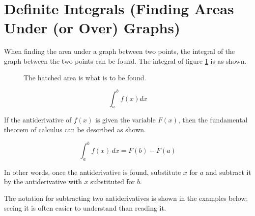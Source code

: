 \section{Definite Integrals (Finding Areas Under (or Over) Graphs)}
When finding the area under a graph between two points, the integral of the graph between the two points can be found. The integral of figure \ref{fig:integralDefiniteEx1} is as shown.
\begin{figure}[h!]
	\centering
	\caption{The hatched area is what is to be found.}
	\label{fig:integralDefiniteEx1}
\end{figure}
\begin{equation}
	\int_{a}^{b} f(x) dx
\end{equation}

If the antiderivative of $f(x)$ is given the variable $F(x)$, then the fundamental theorem of calculus can be described as shown.

\begin{equation}
	\int_{a}^{b} f(x) \, dx = F(b) - F(a)
\end{equation}

In other words, once the antiderivative is found, substitute $x$ for $a$ and subtract it by the antiderivative with $x$ substituted for $b$.

The notation for subtracting two antiderivatives is shown in the examples below; seeing it is often easier to understand than reading it.

